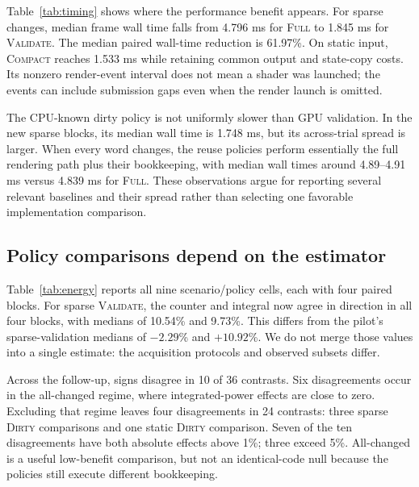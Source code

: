 \documentclass[10pt,conference]{IEEEtran}
\newcommand{\Full}{\textsc{Full}}
\newcommand{\Validate}{\textsc{Validate}}
\newcommand{\Dirty}{\textsc{Dirty}}
\newcommand{\Compact}{\textsc{Compact}}
\begin{document}
Table~\ref{tab:timing} shows where the performance benefit appears. For sparse changes, median frame wall time falls from 4.796 ms for \Full{} to 1.845 ms for \Validate{}. The median paired wall-time reduction is 61.97\%. On static input, \Compact{} reaches 1.533 ms while retaining common output and state-copy costs. Its nonzero render-event interval does not mean a shader was launched; the events can include submission gaps even when the render launch is omitted.

The CPU-known dirty policy is not uniformly slower than GPU validation. In the new sparse blocks, its median wall time is 1.748 ms, but its across-trial spread is larger. When every word changes, the reuse policies perform essentially the full rendering path plus their bookkeeping, with median wall times around 4.89--4.91 ms versus 4.839 ms for \Full{}. These observations argue for reporting several relevant baselines and their spread rather than selecting one favorable implementation comparison.

\begin{table}[t]
\centering
\caption{Follow-up timing and absolute power estimates. Wall time is the median of four trial medians, with their interquartile range. Other columns are medians of trial summaries. GPU, render and copy values are CUDA event intervals; their marginal medians need not add. $\widehat P$ uses the counter-aligned power integral.}
\label{tab:timing}

\end{table}

\subsection{Policy comparisons depend on the estimator}
Table~\ref{tab:energy} reports all nine scenario/policy cells, each with four paired blocks. For sparse \Validate{}, the counter and integral now agree in direction in all four blocks, with medians of 10.54\% and 9.73\%. This differs from the pilot's sparse-validation medians of $-2.29$\% and $+10.92$\%. We do not merge those values into a single estimate: the acquisition protocols and observed subsets differ.

Across the follow-up, signs disagree in 10 of 36 contrasts. Six disagreements occur in the all-changed regime, where integrated-power effects are close to zero. Excluding that regime leaves four disagreements in 24 contrasts: three sparse \Dirty{} comparisons and one static \Dirty{} comparison. Seven of the ten disagreements have both absolute effects above 1\%; three exceed 5\%. All-changed is a useful low-benefit comparison, but not an identical-code null because the policies still execute different bookkeeping.
\end{document}
